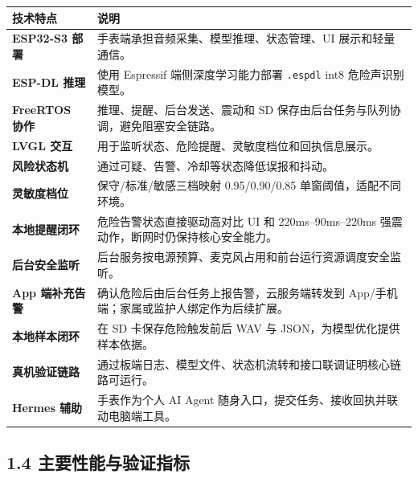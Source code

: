 \documentclass[UTF8,a4paper,12pt]{ctexart}
\begin{document}
\noindent\begin{tabularx}{\linewidth}{>{\bfseries}p{3.3cm}>{\RaggedRight\arraybackslash}X}
\toprule
技术特点 & 说明 \\
\midrule
ESP32-S3 部署 & 手表端承担音频采集、模型推理、状态管理、UI 展示和轻量通信。 \\
ESP-DL 推理 & 使用 Espressif 端侧深度学习能力部署 \texttt{.espdl} int8 危险声识别模型。 \\
FreeRTOS 协作 & 推理、提醒、后台发送、震动和 SD 保存由后台任务与队列协调，避免阻塞安全链路。 \\
LVGL 交互 & 用于监听状态、危险提醒、灵敏度档位和回执信息展示。 \\
风险状态机 & 通过可疑、告警、冷却等状态降低误报和抖动。 \\
灵敏度档位 & 保守/标准/敏感三档映射 0.95/0.90/0.85 单窗阈值，适配不同环境。 \\
本地提醒闭环 & 危险告警状态直接驱动高对比 UI 和 220ms--90ms--220ms 强震动作，断网时仍保持核心安全能力。 \\
后台安全监听 & 后台服务按电源预算、麦克风占用和前台运行资源调度安全监听。 \\
App 端补充告警 & 确认危险后由后台任务上报告警，云服务端转发到 App/手机端；家属或监护人绑定作为后续扩展。 \\
本地样本闭环 & 在 SD 卡保存危险触发前后 WAV 与 JSON，为模型优化提供样本依据。 \\
真机验证链路 & 通过板端日志、模型文件、状态机流转和接口联调证明核心链路可运行。 \\
Hermes 辅助 & 手表作为个人 AI Agent 随身入口，提交任务、接收回执并联动电脑端工具。 \\
\bottomrule
\end{tabularx}

\clearpage

\subsection*{1.4 主要性能与验证指标}
\end{document}
